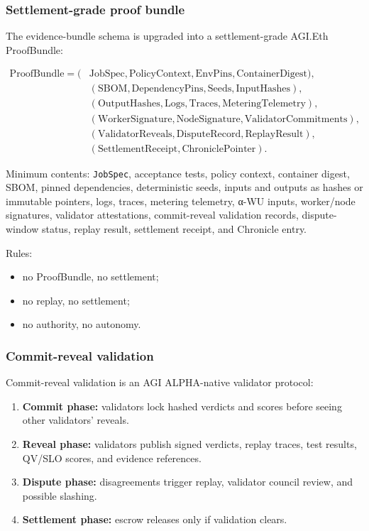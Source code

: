 \documentclass[
  11pt,
]{article}
\providecommand{\tightlist}{%
  \setlength{\itemsep}{0pt}\setlength{\parskip}{0pt}}
\begin{document}
\subsubsection{Settlement-grade proof
bundle}\label{settlement-grade-proof-bundle}

The evidence-bundle schema is upgraded into a settlement-grade AGI.Eth
ProofBundle:

\[
\begin{aligned}
\mathrm{ProofBundle}=(&\mathrm{JobSpec},\mathrm{PolicyContext},\mathrm{EnvPins},\mathrm{ContainerDigest}),\\
& (\mathrm{SBOM},\mathrm{DependencyPins},\mathrm{Seeds},\mathrm{InputHashes}),\\
& (\mathrm{OutputHashes},\mathrm{Logs},\mathrm{Traces},\mathrm{MeteringTelemetry}),\\
& (\mathrm{WorkerSignature},\mathrm{NodeSignature},\mathrm{ValidatorCommitments}),\\
& (\mathrm{ValidatorReveals},\mathrm{DisputeRecord},\mathrm{ReplayResult}),\\
& (\mathrm{SettlementReceipt},\mathrm{ChroniclePointer}).
\end{aligned}
\]

Minimum contents: \texttt{JobSpec}, acceptance tests, policy context,
container digest, SBOM, pinned dependencies, deterministic seeds, inputs
and outputs as hashes or immutable pointers, logs, traces, metering
telemetry, α-WU inputs, worker/node signatures, validator attestations,
commit-reveal validation records, dispute-window status, replay result,
settlement receipt, and Chronicle entry.

Rules:

\begin{itemize}
\tightlist
\item
  no ProofBundle, no settlement;
\item
  no replay, no settlement;
\item
  no authority, no autonomy.
\end{itemize}

\subsubsection{Commit-reveal validation}\label{commit-reveal-validation}

Commit-reveal validation is an AGI ALPHA-native validator protocol:

\begin{enumerate}
\def\labelenumi{\arabic{enumi}.}
\tightlist
\item
  \textbf{Commit phase:} validators lock hashed verdicts and scores
  before seeing other validators' reveals.
\item
  \textbf{Reveal phase:} validators publish signed verdicts, replay
  traces, test results, QV/SLO scores, and evidence references.
\item
  \textbf{Dispute phase:} disagreements trigger replay, validator
  council review, and possible slashing.
\item
  \textbf{Settlement phase:} escrow releases only if validation clears.
\end{enumerate}
\end{document}
